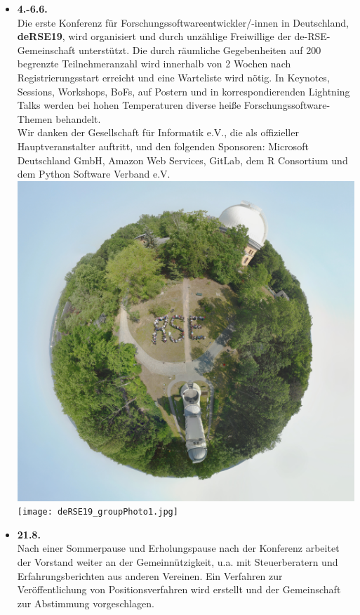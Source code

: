 \begin{itemize}
 \item \textbf{4.-6.6.}\\
 Die erste Konferenz für Forschungssoftwareentwickler/-innen in Deutschland, \textbf{deRSE19}, wird organisiert und durch unzählige Freiwillige der de-RSE-Gemeinschaft unterstützt. Die durch räumliche Gegebenheiten auf 200 begrenzte Teilnehmeranzahl wird innerhalb von 2 Wochen nach Registrierungsstart erreicht und eine Warteliste wird nötig. In Keynotes, Sessions, Workshops, BoFs, auf Postern und in korrespondierenden Lightning Talks werden bei hohen Temperaturen diverse heiße Forschungssoftware-Themen behandelt.\\
 Wir danken der Gesellschaft für Informatik e.V., die als offizieller Hauptveranstalter auftritt, und den folgenden Sponsoren: Microsoft Deutschland GmbH, Amazon Web Services, GitLab, dem R Consortium und dem Python Software Verband e.V.\\
 \includegraphics[width=\textwidth]{deRSE19_littlePlanet.jpg}\\
 \texttt{[image: deRSE19\_groupPhoto1.jpg]}
 \item \textbf{21.8.}\\
 Nach einer Sommerpause und Erholungspause nach der Konferenz arbeitet der Vorstand weiter an der Gemeinnützigkeit, u.a. mit Steuerberatern und Erfahrungsberichten aus anderen Vereinen. Ein Verfahren zur Veröffentlichung von Positionsverfahren wird erstellt und der Gemeinschaft zur Abstimmung vorgeschlagen.

\end{itemize}
